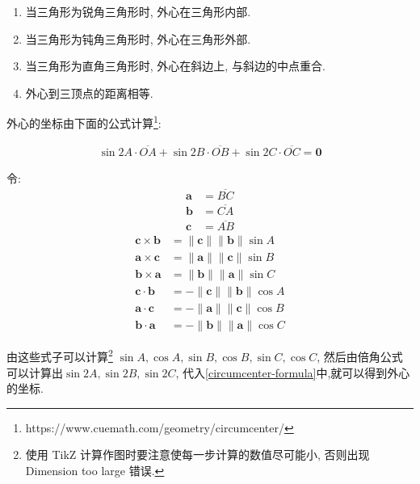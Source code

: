 \begin{enumerate}
  \item 当三角形为锐角三角形时, 外心在三角形内部.
  \item 当三角形为钝角三角形时, 外心在三角形外部.
  \item 当三角形为直角三角形时, 外心在斜边上, 与斜边的中点重合. 
  \item 外心到三顶点的距离相等.
\end{enumerate}

外心的坐标由下面的公式计算\footnote{https://www.cuemath.com/geometry/circumcenter/}:

\begin{align}
  \label{circumcenter-formula}
  \sin{2A} \cdot \overline{OA}+\sin{2B} \cdot \overline{OB}+\sin{2C} \cdot \overline{OC}=\boldsymbol{0}
\end{align}

令:
\begin{align}
  \boldsymbol{a} &= \overline{BC} \\
  \boldsymbol{b} &= \overline{CA} \\
  \boldsymbol{c} &= \overline{AB}
\end{align}
\begin{align}
  \boldsymbol{c} \times \boldsymbol{b} &= \|\boldsymbol{c}\| \|\boldsymbol{b}\| \sin{A} \\
  \boldsymbol{a} \times \boldsymbol{c} &= \|\boldsymbol{a}\| \|\boldsymbol{c}\| \sin{B} \\
  \boldsymbol{b} \times \boldsymbol{a} &= \|\boldsymbol{b}\| \|\boldsymbol{a}\| \sin{C} \\
  \boldsymbol{c} \cdot \boldsymbol{b} &= -\|\boldsymbol{c}\| \|\boldsymbol{b}\| \cos{A} \\
  \boldsymbol{a} \cdot \boldsymbol{c} &= -\|\boldsymbol{a}\| \|\boldsymbol{c}\| \cos{B} \\
  \boldsymbol{b} \cdot \boldsymbol{a} &= -\|\boldsymbol{b}\| \|\boldsymbol{a}\| \cos{C} 
\end{align}

由这些式子可以计算\footnote{使用 TikZ 计算作图时要注意使每一步计算的数值尽可能小, 否则出现 Dimension too large 错误.} 
$\sin{A},\cos{A},\sin{B},\cos{B},\sin{C},\cos{C}$, 
然后由倍角公式可以计算出$\sin{2A},\sin{2B},\sin{2C}$, 
代入\ref{circumcenter-formula}中,就可以得到外心的坐标.


